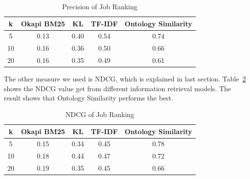 \begin{table}[ht]
\caption{Precision of Job Ranking } %
\centering %
\begin{tabular}{    | c | c | c | c | c |  }
 \hline
       k     & Okapi BM25 & KL    & TF-IDF   & Ontology Similarity  \\
 \hline
       5     & 0.13       & 0.40  & 0.54     & 0.74   \\
 \hline
       10    & 0.16       & 0.36  & 0.50     & 0.66   \\
 \hline
       20    & 0.16       & 0.35  & 0.49     & 0.61   \\
 \hline

\end{tabular}
\label{tab:job_precision} %
\end{table}

The other measure we used is NDCG, which is explained in last section. Table~\ref{tab:job_ndcg} shows the NDCG value get from different information retrieval models. The result shows that Ontology Similarity  performs the best.

\begin{table}[ht]
\caption{NDCG of Job Ranking } %
\centering %
\begin{tabular}{    | c | c | c | c | c |  }
 \hline
       k    & Okapi BM25 & KL    & TF-IDF & Ontology Similarity  \\
 \hline
       5    & 0.15       & 0.34  & 0.45     & 0.78   \\
 \hline
       10   & 0.18       & 0.44  & 0.47     & 0.72   \\
 \hline
       20   & 0.19       & 0.35  & 0.45     & 0.66   \\
 \hline

\end{tabular}
\label{tab:job_ndcg} %
\end{table}

